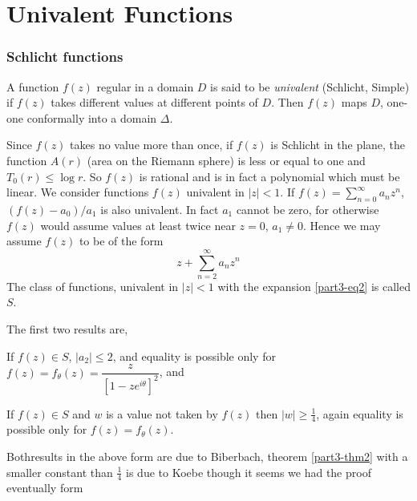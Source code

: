 \chapter{Univalent Functions}\label{part3}

\setcounter{section}{3}
\setcounter{subsection}{0}
\subsection{Schlicht functions}\label{part3-sec3.1}\pageoriginale

\begin{defi*}
A function $f(z)$ regular in a domain $D$ is said to be {\em
  univalent} (Schlicht, Simple) if $f(z)$ takes different values at
different points of $D$. Then $f(z)$ maps $D$, one-one conformally
into a domain $\Delta$.
\end{defi*}

Since $f(z)$ takes no value more than once, if $f(z)$ is Schlicht in
the plane, the function $A(r)$ (area on the Riemann sphere) is less or
equal to one and $T_{0}(r)\leq \log r$. So $f(z)$ is rational and is
in fact a polynomial which must be linear. We consider functions
$f(z)$ univalent in $|z|<1$. If
$f(z)=\sum\limits^{\infty}_{n=0}a_{n}z^{n}$, $(f(z)-a_{0})/a_{1}$ is
also univalent. In fact $a_{1}$ cannot be zero, for otherwise $f(z)$
would assume values at least twice near $z=0$, $a_{1}\neq 0$. Hence we
may assume $f(z)$ to be of the form 
\begin{equation*}
z+\sum\limits^{\infty}_{n=2}a_{n}z^{n}\tag{2}\label{part3-eq2}
\end{equation*}
The class of functions, univalent in $|z|<1$ with the expansion
\eqref{part3-eq2} is called $S$.

The first two results are,

\setcounter{thm}{0}
\begin{thm}\label{part3-thm1}
If $f(z)\in S$, $|a_{2}|\leq 2$, and equality is possible only for
$f(z)=f_{\theta}(z)=\dfrac{z}{[1-ze^{i\theta}]^{2}}$, and
\end{thm}

\begin{thm}\label{part3-thm2}
If $f(z)\in S$ and $w$ is a value not taken by $f(z)$ then $|w|\geq
\frac{1}{4}$, again equality is possible only for
$f(z)=f_{\theta}(z)$. 
\end{thm}

Both\pageoriginale results in the above form are due to Biberbach,
theorem \ref{part3-thm2} with a smaller constant than $\frac{1}{4}$ is
due to Koebe though it seems we had the proof eventually form

